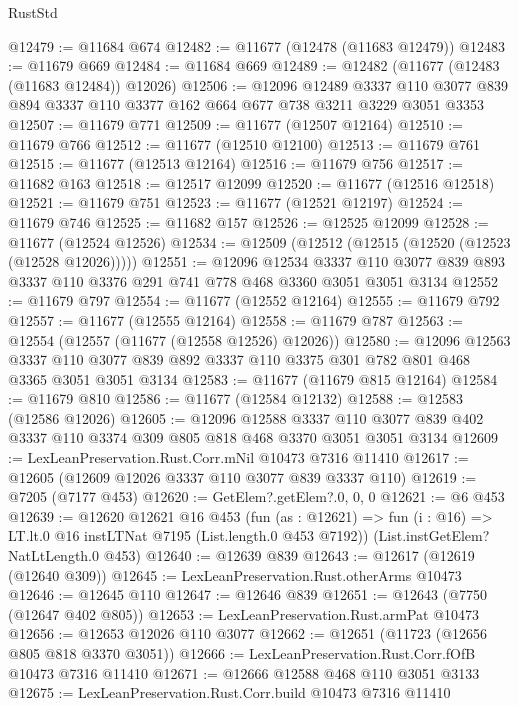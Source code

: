 \begin{lexlean}{RustStd}
\begin{coremodule}
@12479 := @11684 @674
@12482 := @11677 (@12478 (@11683 @12479))
@12483 := @11679 @669
@12484 := @11684 @669
@12489 := @12482 (@11677 (@12483 (@11683 @12484)) @12026)
@12506 := @12096
    @12489
    @3337
    @110
    @3077
    @839
    @894
    @3337
    @110
    @3377
    @162
    @664
    @677
    @738
    @3211
    @3229
    @3051
    @3353
@12507 := @11679 @771
@12509 := @11677 (@12507 @12164)
@12510 := @11679 @766
@12512 := @11677 (@12510 @12100)
@12513 := @11679 @761
@12515 := @11677 (@12513 @12164)
@12516 := @11679 @756
@12517 := @11682 @163
@12518 := @12517 @12099
@12520 := @11677 (@12516 @12518)
@12521 := @11679 @751
@12523 := @11677 (@12521 @12197)
@12524 := @11679 @746
@12525 := @11682 @157
@12526 := @12525 @12099
@12528 := @11677 (@12524 @12526)
@12534 := @12509 (@12512 (@12515 (@12520 (@12523 (@12528 @12026)))))
@12551 := @12096
    @12534
    @3337
    @110
    @3077
    @839
    @893
    @3337
    @110
    @3376
    @291
    @741
    @778
    @468
    @3360
    @3051
    @3051
    @3134
@12552 := @11679 @797
@12554 := @11677 (@12552 @12164)
@12555 := @11679 @792
@12557 := @11677 (@12555 @12164)
@12558 := @11679 @787
@12563 := @12554 (@12557 (@11677 (@12558 @12526) @12026))
@12580 := @12096
    @12563
    @3337
    @110
    @3077
    @839
    @892
    @3337
    @110
    @3375
    @301
    @782
    @801
    @468
    @3365
    @3051
    @3051
    @3134
@12583 := @11677 (@11679 @815 @12164)
@12584 := @11679 @810
@12586 := @11677 (@12584 @12132)
@12588 := @12583 (@12586 @12026)
@12605 := @12096
    @12588
    @3337
    @110
    @3077
    @839
    @402
    @3337
    @110
    @3374
    @309
    @805
    @818
    @468
    @3370
    @3051
    @3051
    @3134
@12609 := LexLeanPreservation.Rust.Corr.mNil @10473 @7316 @11410
@12617 := @12605 (@12609 @12026 @3337 @110 @3077 @839 @3337 @110)
@12619 := @7205 (@7177 @453)
@12620 := GetElem?.getElem?.{0, 0, 0}
@12621 := @6 @453
@12639 := @12620
    @12621
    @16
    @453
    (fun (as : @12621) =>
    fun (i : @16) => LT.lt.{0} @16 instLTNat @7195 (List.length.{0} @453 @7192))
    (List.instGetElem?NatLtLength.{0} @453)
@12640 := @12639 @839
@12643 := @12617 (@12619 (@12640 @309))
@12645 := LexLeanPreservation.Rust.otherArms @10473
@12646 := @12645 @110
@12647 := @12646 @839
@12651 := @12643 (@7750 (@12647 @402 @805))
@12653 := LexLeanPreservation.Rust.armPat @10473
@12656 := @12653 @12026 @110 @3077
@12662 := @12651 (@11723 (@12656 @805 @818 @3370 @3051))
@12666 := LexLeanPreservation.Rust.Corr.fOfB @10473 @7316 @11410
@12671 := @12666 @12588 @468 @110 @3051 @3133
@12675 := LexLeanPreservation.Rust.Corr.build @10473 @7316 @11410

\end{coremodule}
\end{lexlean}
